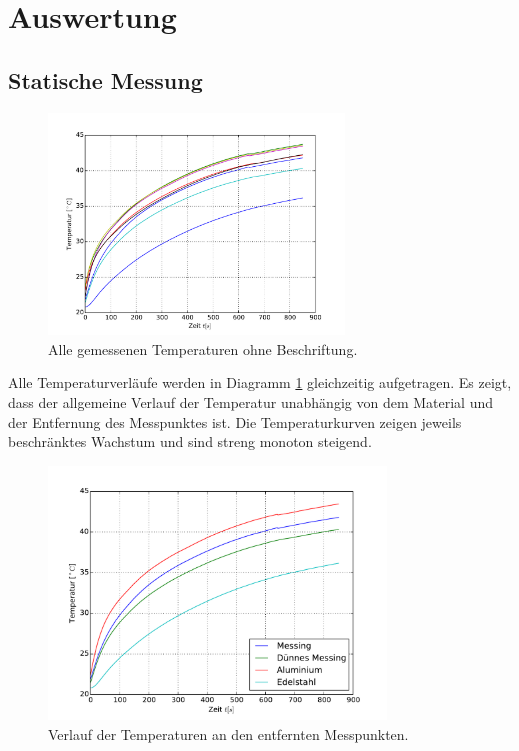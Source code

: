 \section{Auswertung}
\label{sec:Auswertung}
\subsection{Statische Messung}
\label{sub:statik}
\begin{figure}
	\centering
	\includegraphics[width=0.7\textwidth]{Bilder/M1_Overview.pdf}
	\caption{Alle gemessenen Temperaturen ohne Beschriftung.}
	\label{fig:overview1}
\end{figure}
Alle Temperaturverläufe werden in Diagramm \ref{fig:overview1} gleichzeitig aufgetragen. Es zeigt, dass der allgemeine Verlauf der Temperatur unabhängig von dem Material und der Entfernung des Messpunktes ist. Die Temperaturkurven zeigen jeweils beschränktes Wachstum und sind streng monoton steigend.
\begin{figure}[p]
	\centering
	\includegraphics[width=0.8\textwidth]{Bilder/M1_Tempverl.pdf}
	\caption{Verlauf der Temperaturen an den entfernten Messpunkten.}
	\label{fig:entftemp}
\end{figure}
